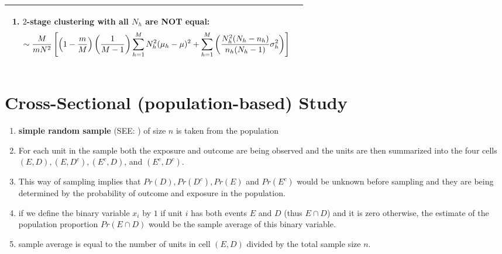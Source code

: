\begin{longtable}{|p{2cm}|p{12cm}|}
\begin{minipage}{11cm}
\begin{enumerate}
            \item $2$-stage clustering with all $N_h$ are \textbf{NOT} equal:
            \[
                \sim
                \dfrac{M}{mN^2} \left[
                    \left(1- \dfrac{m}{M} \right)
                    \left(\dfrac{1}{M-1} \right)
                    \displaystyle\sum_{h=1}^{M}
                    N_h^2(\mu_h - \mu)^2
                    +
                    \displaystyle\sum_{h=1}^{M}
                    \left(
                        \dfrac{N_h^2 (N_h-n_h)}{n_h(N_h -1)}
                        \sigma_h^2
                    \right)
                \right]
            \]
        \end{enumerate}
        \vspace{0.2cm}
    \end{minipage}\\
    \hline

    
\end{longtable}


\section{Cross-Sectional (population-based) Study \cite{ism-1}}\label{Cross-Sectional (population-based) Study}

\begin{enumerate}
    \item \textbf{simple random sample} (SEE: ) of size $n$ is taken from the population

    \item For each unit in the sample both the exposure and outcome are being observed and the units are then summarized into the four cells $(E, D), (E, D^c), (E^c, D)$, and $(E^c, D^c)$.

    \item This way of sampling implies that $Pr(D), Pr(D^c), Pr(E)$ and $Pr(E^c)$ would be unknown before sampling and they are being determined by the probability of outcome and exposure in the population.

    \item if we define the binary variable $x_i$ by $1$ if unit $i$ has both events $E$ and $D$ (thus $E \cap D$) and it is zero otherwise, the estimate of the population proportion $Pr(E \cap D)$ would be the sample average of this binary variable. 

    \item sample average is equal to the number of units in cell $(E, D)$ divided by the total sample size $n$.

\end{enumerate}


